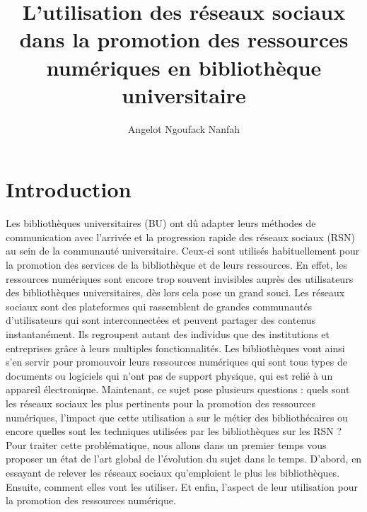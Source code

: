 \documentclass[a4paper,11pt]{article} %
\title{L’utilisation des réseaux sociaux dans la promotion des ressources
numériques en bibliothèque universitaire} %
\author{Angelot Ngoufack Nanfah} %
\date{} %
\begin{document}
\maketitle %
\newpage

\section{Introduction} %
Les bibliothèques universitaires (BU) ont dû adapter leurs méthodes de communication
avec l’arrivée et la progression rapide des réseaux sociaux (RSN) au sein de la communauté 
universitaire. Ceux-ci sont utilisés habituellement pour la promotion des services de la 
bibliothèque et de leurs ressources. En effet, les ressources numériques sont encore trop souvent 
invisibles auprès des utilisateurs des bibliothèques universitaires, dès lors cela pose un grand 
souci. Les réseaux sociaux sont des plateformes 
qui rassemblent de grandes communautés d’utilisateurs qui sont interconnectées et peuvent 
partager des contenus instantanément. Ils regroupent autant des individus que des institutions 
et entreprises grâce à leurs multiples fonctionnalités. Les bibliothèques vont ainsi s’en servir 
pour promouvoir leurs ressources numériques qui sont tous types de documents ou logiciels qui
n’ont pas de support physique, qui est relié à un appareil électronique.
Maintenant, ce sujet pose plusieurs questions : quels sont les réseaux sociaux les plus 
pertinents pour la promotion des ressources numériques, l’impact que cette utilisation a sur le 
métier des bibliothécaires ou encore quelles sont les techniques utilisées par les bibliothèques 
sur les RSN ? Pour traiter cette problématique, nous allons dans un premier temps vous proposer 
un état de l’art global de l’évolution du sujet dans le temps. D’abord, en essayant de relever les 
réseaux sociaux qu’emploient le plus les bibliothèques. Ensuite, comment elles vont les 
utiliser. Et enfin, l’aspect de leur utilisation pour la promotion des ressources numérique.\newpage
\end{document}
